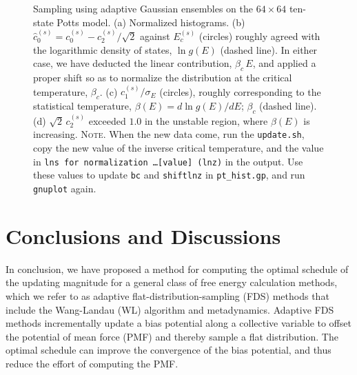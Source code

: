 \documentclass[reprint, superscriptaddress, floatfix]{revtex4-1}
\newcommand{\note}[1]{{\color{DarkGreen}\footnotesize \textsc{Note.} #1}}
\begin{document}
\begin{figure}[h]\centering
  \caption{
    \label{fig:pt_hist}
    Sampling using adaptive Gaussian ensembles
    on the $64 \times 64$ ten-state Potts model.
    (a) Normalized histograms.
    (b) $\hat c_0^{(s)} = c_0^{(s)} - c_2^{(s)}/\sqrt 2$ 
    against $E_c^{(s)}$ (circles)
    roughly agreed with the logarithmic density of states,
    $\ln g(E)$ (dashed line).
    In either case,
    we have deducted the linear contribution, $\beta_c \, E$,
    and applied a proper shift so as to normalize
    the distribution at the critical temperature, $\beta_c$.
    (c) $c_1^{(s)}/\sigma_E$ (circles), roughly corresponding to
    the statistical temperature, $\beta(E) = d\ln g(E)/dE$;
    $\beta_c$ (dashed line).
    (d) $\sqrt 2 \, c_2^{(s)}$
    exceeded $1.0$ in the unstable region,
    where $\beta(E)$ is increasing.
    \note{When the new data come,
    run the \texttt{update.sh},
    copy the new value of the inverse critical temperature,
    and the value in \texttt{lns for normalization \dots [value] (lnz)}
    in the output.
    Use these values to update \texttt{bc} and \texttt{shiftlnz}
    in \texttt{pt\_hist.gp}, and run \texttt{gnuplot} again.  }%
  }
\end{figure}


\section{\label{sec:conclusion}
Conclusions and Discussions}



In conclusion,
we have proposed a method for computing
the optimal schedule of the updating magnitude
for a general class of free energy calculation methods,
which we refer to as adaptive flat-distribution-sampling (FDS) methods
that include the Wang-Landau (WL) algorithm and metadynamics.
%
Adaptive FDS methods
incrementally update a bias potential
along a collective variable
to offset the potential of mean force (PMF)
and thereby sample a flat distribution.
%
The optimal schedule can improve the convergence
of the bias potential,
and thus reduce the effort
of computing the PMF.
\end{document}
